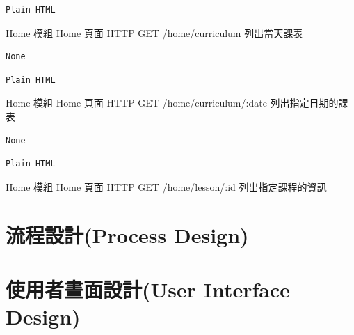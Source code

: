 \documentclass{article}
\begin{document}
\begin{lrbox}{\jsonoutputbox}
	\begin{lstlisting}
Plain HTML
\end{lstlisting}
\end{lrbox}

{Home 模組}
{Home 頁面}
{HTTP GET}
{/home/curriculum}
{列出當天課表}

\bigskip

\begin{lrbox}{\jsoninputbox}
	\begin{lstlisting}
None
\end{lstlisting}
\end{lrbox}

\begin{lrbox}{\jsonoutputbox}
	\begin{lstlisting}
Plain HTML
\end{lstlisting}
\end{lrbox}

{Home 模組}
{Home 頁面}
{HTTP GET}
{/home/curriculum/:date}
{列出指定日期的課表}

\bigskip

\begin{lrbox}{\jsoninputbox}
	\begin{lstlisting}
None
\end{lstlisting}
\end{lrbox}

\begin{lrbox}{\jsonoutputbox}
	\begin{lstlisting}
Plain HTML
\end{lstlisting}
\end{lrbox}

{Home 模組}
{Home 頁面}
{HTTP GET}
{/home/lesson/:id}
{列出指定課程的資訊}

\newpage

\section[流程設計(PROCESS DESIGN)]{流程設計(Process Design)}

\newpage

\section[使用者畫面設計(USER INTERFACE DESIGN)]{使用者畫面設計(User Interface Design)}

\newpage
\end{document}
